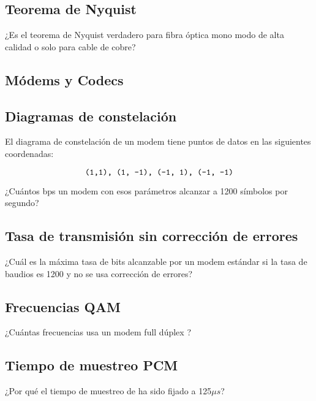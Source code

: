 \documentclass[12pt]{report}
\begin{document}
\begin{exer}
	\subsection{Teorema de Nyquist \stwo \steo}
	¿Es el teorema de Nyquist verdadero para fibra óptica mono modo de alta calidad o solo para cable de cobre?
\end{exer}

\begin{exer}
	\section{Módems y Codecs}
	\subsection{Diagramas de constelación \sthree}
	El diagrama de constelación de un modem tiene puntos de datos en las siguientes
	coordenadas:

	$$ \texttt{(1,1), (1, -1), (-1, 1), (-1, -1)} $$

	¿Cuántos bps un modem con esos parámetros alcanzar
	a 1200 símbolos por segundo?
\end{exer}

\begin{exer}
	\subsection{Tasa de transmisión sin corrección de errores \stwo}
	¿Cuál es la máxima tasa de bits alcanzable por un modem estándar  si la tasa de baudios es 1200 y no se usa corrección de errores?
\end{exer}

\begin{exer}
	\subsection{Frecuencias QAM \stwo \steo}
	¿Cuántas frecuencias usa un modem full dúplex ?
\end{exer}

\begin{exer}
	\subsection{Tiempo de muestreo PCM \stwo \steo}
	¿Por qué el tiempo de muestreo de  ha sido fijado a 125$\mu s$?
\end{exer}
\end{document}
